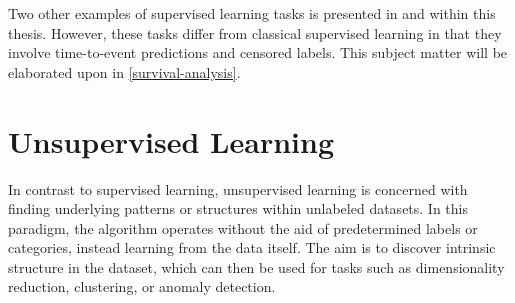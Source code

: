 Two other examples of supervised learning tasks is presented in 
\studyii{} and \studyiii{} within this thesis.
However, these tasks differ from classical supervised learning
in that they involve time-to-event predictions and censored labels.
This subject matter will be elaborated upon in \cref{survival-analysis}.

\section{Unsupervised Learning}

In contrast to supervised learning,
unsupervised learning is concerned with finding 
underlying patterns or structures within unlabeled datasets. 
In this paradigm, the algorithm operates without the aid of 
predetermined labels or categories, instead learning from the data itself. 
The aim is to discover intrinsic structure in the dataset, 
which can then be used for tasks such as 
dimensionality reduction, clustering, or anomaly detection.

